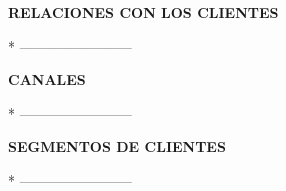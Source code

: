 \begin{enumerate}[1.]
\begin{center}
\textbf {RELACIONES CON LOS CLIENTES} \newline
\end{center}
* ------------------------\newline
\\ 

\begin{center}
\textbf {CANALES} \newline
\end{center}
* ------------------------\newline
\\ 

\begin{center}
\textbf {SEGMENTOS DE CLIENTES} \newline
\end{center}
* ------------------------\newline
\\ 


\end{enumerate} 
